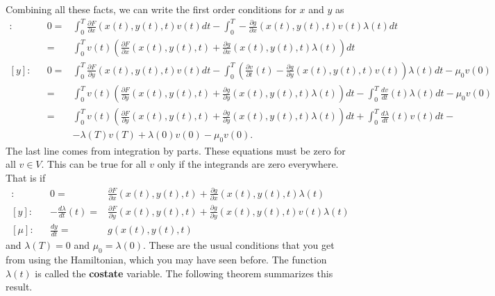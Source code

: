 \documentclass[12pt,reqno]{amsart}
\theoremstyle{definition}
\begin{document}
Combining all these facts, we can write the first order conditions for
$x$ and $y$ as 
\begin{align*}
  [x]:&& 0 = & \int_0^T \frac{\partial F}{\partial x}(x(t),y(t),t) v(t) dt -
  \int_0^T -\frac{\partial g}{\partial x}(x(t),y(t),t) v(t) \lambda(t)
  dt \\ 
  && = & \int_0^T v(t) \left(\frac{\partial F}{\partial x}(x(t),y(t),t) +
    \frac{\partial g}{\partial x}(x(t),y(t),t) \lambda(t)\right) dt \\
  [y]:&& 0 = & \int_0^T \frac{\partial F}{\partial
    y}(x(t),y(t),t) v(t) dt - 
  \int_0^T \left(\frac{\partial v}{\partial t}(t) -\frac{\partial
      g}{\partial y}(x(t),y(t),t) v(t)\right) \lambda(t)  dt  - \mu_0v(0)\\
  && = & \int_0^T v(t) \left(\frac{\partial F}{\partial
      y}(x(t),y(t),t) + \frac{\partial g}{\partial y}(x(t),y(t),t)
    \lambda(t)  \right)dt - \int_0^T \frac{dv}{dt}(t)\lambda(t)
  dt  - \mu_0v(0)\\
  && = & \int_0^T v(t) \left(\frac{\partial F}{\partial
      y}(x(t),y(t),t) + \frac{\partial g}{\partial y}(x(t),y(t),t)
    \lambda(t)  \right)dt + \int_0^T \frac{d\lambda}{dt}(t)v(t)dt -
  \\ 
  &&  & - \lambda(T)v(T) + \lambda(0)v(0)  - \mu_0v(0).
\end{align*}
The last line comes from integration by parts. These equations must be
zero for all $v \in V$. This can be true for all $v$ only if the
integrands are zero everywhere.  That is if
\begin{align*}
  [x]:&& 0 = &\frac{\partial F}{\partial x}(x(t),y(t),t) +
  \frac{\partial g}{\partial x}(x(t),y(t),t) \lambda(t) \\
  [y]:&& -\frac{d\lambda}{dt}(t) = & \frac{\partial F}{\partial
    y}(x(t),y(t),t) + \frac{\partial g}{\partial y}(x(t),y(t),t)
  v(t) \lambda(t) \\
  [\mu]:&& \frac{dy}{dt} = & g(x(t),y(t),t) 
\end{align*}
and $\lambda(T) = 0$ and $\mu_0 = \lambda(0)$. These are the usual
conditions that you get from using the Hamiltonian, which you may have
seen before. The function $\lambda(t)$ is called the \textbf{costate}
variable. The following theorem summarizes this result.
\end{document}
